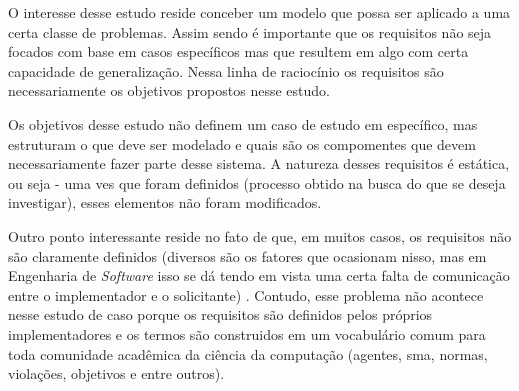 O interesse desse estudo reside conceber um modelo que possa ser aplicado a uma certa classe de problemas. Assim sendo é importante que os requisitos não seja focados com base em casos específicos mas que resultem em algo com certa capacidade de generalização. Nessa linha de raciocínio os requisitos são necessariamente os objetivos propostos nesse estudo. 

Os objetivos desse estudo não definem um caso de estudo em específico, mas estruturam o que deve ser modelado e quais são os compomentes que devem necessariamente fazer parte desse sistema. A natureza desses requisitos é estática, ou seja - uma ves que foram definidos (processo obtido na busca do que se deseja investigar), esses elementos não foram modificados. 

Outro ponto interessante reside no fato de que, em muitos casos, os requisitos não são claramente definidos (diversos são os fatores que ocasionam nisso, mas em Engenharia de \textit{Software} isso se dá tendo em vista uma certa falta de comunicação entre o implementador e o solicitante) \cite{softwareeng}. Contudo, esse problema não acontece nesse estudo de caso porque os requisitos são definidos pelos próprios implementadores e os termos são construidos em um vocabulário comum para toda comunidade acadêmica da ciência da computação (agentes, sma, normas, violações, objetivos e entre outros). 
